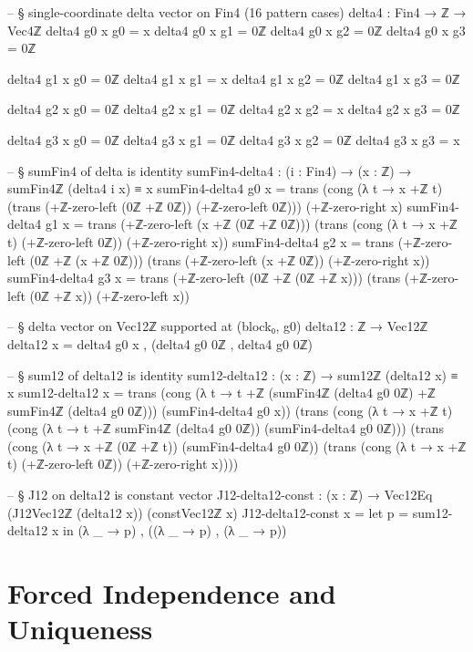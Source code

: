 \documentclass[11pt,a4paper]{book}
\begin{document}
\begin{code}
-- § single-coordinate delta vector on Fin4 (16 pattern cases)
delta4 : Fin4 → ℤ → Vec4ℤ
delta4 g0 x g0 = x
delta4 g0 x g1 = 0ℤ
delta4 g0 x g2 = 0ℤ
delta4 g0 x g3 = 0ℤ

delta4 g1 x g0 = 0ℤ
delta4 g1 x g1 = x
delta4 g1 x g2 = 0ℤ
delta4 g1 x g3 = 0ℤ

delta4 g2 x g0 = 0ℤ
delta4 g2 x g1 = 0ℤ
delta4 g2 x g2 = x
delta4 g2 x g3 = 0ℤ

delta4 g3 x g0 = 0ℤ
delta4 g3 x g1 = 0ℤ
delta4 g3 x g2 = 0ℤ
delta4 g3 x g3 = x

-- § sumFin4 of delta is identity
sumFin4-delta4 : (i : Fin4) → (x : ℤ) → sumFin4ℤ (delta4 i x) ≡ x
sumFin4-delta4 g0 x =
  trans
    (cong (λ t → x +ℤ t)
      (trans
        (+ℤ-zero-left (0ℤ +ℤ 0ℤ))
        (+ℤ-zero-left 0ℤ)))
    (+ℤ-zero-right x)
sumFin4-delta4 g1 x =
  trans
    (+ℤ-zero-left (x +ℤ (0ℤ +ℤ 0ℤ)))
    (trans
      (cong (λ t → x +ℤ t) (+ℤ-zero-left 0ℤ))
      (+ℤ-zero-right x))
sumFin4-delta4 g2 x =
  trans
    (+ℤ-zero-left (0ℤ +ℤ (x +ℤ 0ℤ)))
    (trans
      (+ℤ-zero-left (x +ℤ 0ℤ))
      (+ℤ-zero-right x))
sumFin4-delta4 g3 x =
  trans
    (+ℤ-zero-left (0ℤ +ℤ (0ℤ +ℤ x)))
    (trans
      (+ℤ-zero-left (0ℤ +ℤ x))
      (+ℤ-zero-left x))

-- § delta vector on Vec12ℤ supported at (block₀, g0)
delta12 : ℤ → Vec12ℤ
delta12 x = delta4 g0 x , (delta4 g0 0ℤ , delta4 g0 0ℤ)

-- § sum12 of delta12 is identity
sum12-delta12 : (x : ℤ) → sum12ℤ (delta12 x) ≡ x
sum12-delta12 x =
  trans
    (cong (λ t → t +ℤ (sumFin4ℤ (delta4 g0 0ℤ) +ℤ sumFin4ℤ (delta4 g0 0ℤ)))
          (sumFin4-delta4 g0 x))
    (trans
      (cong (λ t → x +ℤ t)
            (cong (λ t → t +ℤ sumFin4ℤ (delta4 g0 0ℤ)) (sumFin4-delta4 g0 0ℤ)))
      (trans
        (cong (λ t → x +ℤ (0ℤ +ℤ t)) (sumFin4-delta4 g0 0ℤ))
        (trans
          (cong (λ t → x +ℤ t) (+ℤ-zero-left 0ℤ))
          (+ℤ-zero-right x))))

-- § J12 on delta12 is constant vector
J12-delta12-const : (x : ℤ) → Vec12Eq (J12Vec12ℤ (delta12 x)) (constVec12ℤ x)
J12-delta12-const x =
  let p = sum12-delta12 x in
  (λ _ → p) , ((λ _ → p) , (λ _ → p))
\end{code}

\section{Forced Independence and Uniqueness}
\end{document}
